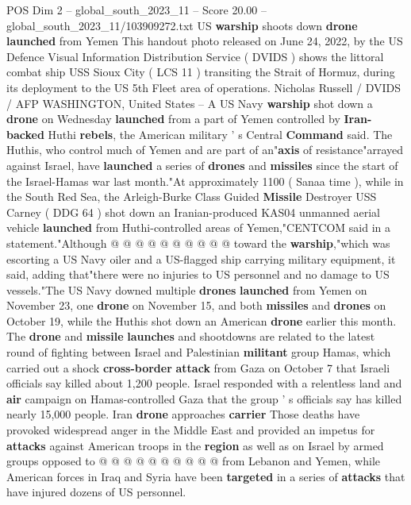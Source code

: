 \begin{textsample}{POS Dim 2 – global\_south\_2023\_11 – Score 20.00 – global\_south\_2023\_11/103909272.txt}  \label{ex:f2_pos_216}
US \textbf{warship} shoots down \textbf{drone} \textbf{launched} from Yemen This handout photo released on June 24, 2022, by the US Defence Visual Information Distribution Service ( DVIDS ) shows the littoral combat ship USS Sioux City ( LCS 11 ) transiting the Strait of Hormuz, during its deployment to the US 5th Fleet area of operations.
Nicholas Russell / DVIDS / AFP WASHINGTON, United States -- A US Navy \textbf{warship} shot down a \textbf{drone} on Wednesday \textbf{launched} from a part of Yemen controlled by \textbf{Iran-backed} Huthi \textbf{rebels}, the American military ' s Central \textbf{Command} said.
The Huthis, who control much of Yemen and are part of an"\textbf{axis} of resistance"arrayed against Israel, have \textbf{launched} a series of \textbf{drones} and \textbf{missiles} since the start of the Israel-Hamas war last month."At approximately 1100 ( Sanaa time ), while in the South Red Sea, the Arleigh-Burke Class Guided \textbf{Missile} Destroyer USS Carney ( DDG 64 ) shot down an Iranian-produced KAS04 unmanned aerial vehicle \textbf{launched} from Huthi-controlled areas of Yemen,"CENTCOM said in a statement."Although @ @ @ @ @ @ @ @ @ @ toward the \textbf{warship},"which was escorting a US Navy oiler and a US-flagged ship carrying military equipment, it said, adding that"there were no injuries to US personnel and no damage to US vessels."The US Navy downed multiple \textbf{drones} \textbf{launched} from Yemen on November 23, one \textbf{drone} on November 15, and both \textbf{missiles} and \textbf{drones} on October 19, while the Huthis shot down an American \textbf{drone} earlier this month.
The \textbf{drone} and \textbf{missile} \textbf{launches} and shootdowns are related to the latest round of fighting between Israel and Palestinian \textbf{militant} group Hamas, which carried out a shock \textbf{cross-border} \textbf{attack} from Gaza on October 7 that Israeli officials say killed about 1,200 people.
Israel responded with a relentless land and \textbf{air} campaign on Hamas-controlled Gaza that the group ' s officials say has killed nearly 15,000 people.
Iran \textbf{drone} approaches \textbf{carrier} Those deaths have provoked widespread anger in the Middle East and provided an impetus for \textbf{attacks} against American troops in the \textbf{region} as well as on Israel by armed groups opposed to @ @ @ @ @ @ @ @ @ @ from Lebanon and Yemen, while American forces in Iraq and Syria have been \textbf{targeted} in a series of \textbf{attacks} that have injured dozens of US personnel.

\end{textsample}
